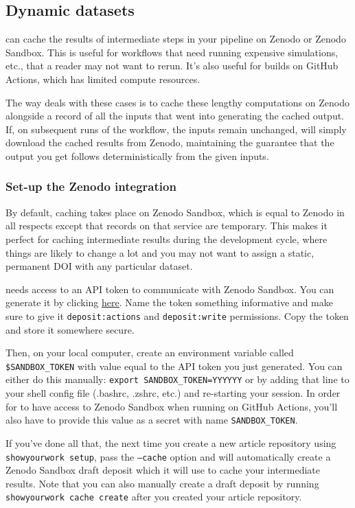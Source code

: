\documentclass{aa}
\begin{document}
\subsection{Dynamic datasets}
\showyourwork can cache the results of intermediate steps in your pipeline on Zenodo or Zenodo Sandbox.
This is useful for workflows that need running expensive simulations, etc., that a reader may not want to rerun.
It's also useful for builds on GitHub Actions, which has limited compute resources.

The way \showyourwork deals with these cases is to cache these lengthy computations on Zenodo alongside a record of all the inputs that went into generating the cached output. If, on subsequent runs of the workflow, the inputs remain unchanged, \showyourwork will simply download the cached results from Zenodo, maintaining the guarantee that the output you get follows deterministically from the given inputs.

\subsubsection{Set-up the Zenodo integration}
By default, caching takes place on Zenodo Sandbox, which is equal to Zenodo in all respects except that records on that service are temporary. This makes it perfect for caching intermediate results during the development cycle, where things are likely to change a lot and you may not want to assign a static, permanent DOI with any particular dataset.

\showyourwork needs access to an API token to communicate with Zenodo Sandbox.
You can generate it by clicking \href{https://sandbox.zenodo.org/account/settings/applications/tokens/new}{here}.
Name the token something informative and make sure to give it \texttt{deposit:actions} and \texttt{deposit:write} permissions.
Copy the token and store it somewhere secure.

Then, on your local computer, create an environment variable called \texttt{\$SANDBOX\_TOKEN} with value equal to the API token you just generated.
You can either do this manually: \texttt{export SANDBOX\_TOKEN=YYYYYY} or by adding that line to your shell config file (.bashrc, .zshrc, etc.) and re-starting your session.
In order for \showyourwork to have access to Zenodo Sandbox when running on GitHub Actions, you'll also have to provide this value as a secret with name \texttt{SANDBOX\_TOKEN}.

If you've done all that, the next time you create a new article repository using \texttt{showyourwork setup}, pass the \texttt{--cache} option and \showyourwork will automatically create a Zenodo Sandbox draft deposit which it will use to cache your intermediate results. Note that you can also manually create a draft deposit by running \texttt{showyourwork cache create} after you created your article repository.
\end{document}
